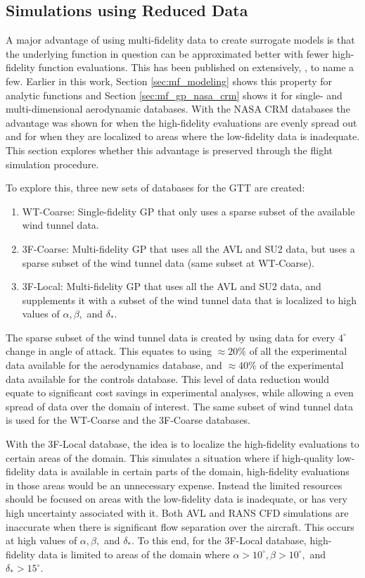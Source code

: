 \subsection{Simulations using Reduced Data}

A major advantage of using multi-fidelity data to create surrogate models is that the underlying function in question can be approximated better with fewer high-fidelity function evaluations.
This has been published on extensively, \cite{kennedy_predicting_2000,gratiet_multi-fidelity_nodate,perdikaris_multi-fidelity_2015, ghoreishi_gaussian_2018}, to name a few. 
Earlier in this work, Section \ref{sec:mf_modeling} shows this property for analytic functions and Section \ref{sec:mf_gp_nasa_crm} shows it for single- and multi-dimensional aerodynamic databases.
With the NASA CRM databases the advantage was shown for when the high-fidelity evaluations are evenly spread out and for when they are localized to areas where the low-fidelity data is inadequate. 
This section explores whether this advantage is preserved through the flight simulation procedure. 

To explore this, three new sets of databases for the GTT are created:
\begin{enumerate}
    \item WT-Coarse: Single-fidelity GP that only uses a sparse subset of the available wind tunnel data.
    \item 3F-Coarse: Multi-fidelity GP that uses all the AVL and SU2 data, but uses a sparse subset of the wind tunnel data (same subset at WT-Coarse).
    \item 3F-Local: Multi-fidelity GP that uses all the AVL and SU2 data, and supplements it with a subset of the wind tunnel data that is localized to high values of $\alpha, \beta,$ and $\delta_*$.
\end{enumerate}

The sparse subset of the wind tunnel data is created by using data for every $4^\circ$ change in angle of attack.
This equates to using $\approx20\%$ of all the experimental data available for the aerodynamics database, and $\approx40\%$ of the experimental data available for the controls database. 
This level of data reduction would equate to significant cost savings in experimental analyses, while allowing a even spread of data over the domain of interest. 
The same subset of wind tunnel data is used for the WT-Coarse and the 3F-Coarse databases. 

With the 3F-Local database, the idea is to localize the high-fidelity evaluations to certain areas of the domain.
This simulates a situation where if high-quality low-fidelity data is available in certain parts of the domain, high-fidelity evaluations in those areas would be an unnecessary expense. 
Instead the limited resources should be focused on areas with the low-fidelity data is inadequate, or has very high uncertainty associated with it. 
Both AVL and RANS CFD simulations are inaccurate when there is significant flow separation over the aircraft. 
This occurs at high values of $\alpha, \beta,$ and $\delta_*$.
To this end, for the 3F-Local database, high-fidelity data is limited to areas of the domain where $\alpha > 10^\circ, \beta > 10^\circ,$ and $\delta_* > 15^\circ$.

